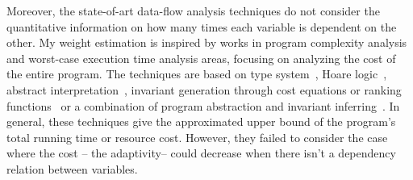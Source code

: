 %
%
%
Moreover, the state-of-art data-flow analysis techniques do not
consider the quantitative information on how many times each variable is dependent on the other. 
My weight estimation is inspired by
 works in program complexity analysis and worst-case execution time analysis areas, 
 focusing on analyzing the cost of the entire program. 
The techniques are based on
type system~\cite{CicekBG0H17, RajaniG0021}, Hoare logic~\cite{CarbonneauxHS15}, abstract interpretation~\cite{GustafssonEL05, HumenbergerJK18},
invariant generation through cost equations or ranking functions~\cite{BrockschmidtEFFG16,AlbertAGP08,AliasDFG10,Flores-MontoyaH14}
or a combination of program abstraction and invariant inferring~\cite{GulwaniZ10, SinnZV17, GulwaniJK09}.
In general, these techniques give the approximated upper bound of the program's total running time or resource cost.
However, they failed to consider the case where the cost -- the adaptivity-- could decrease when there isn't a dependency relation between variables.


